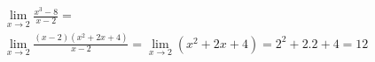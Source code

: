 \begin{ex}
\begin{align}
&\lim_{x\rightarrow 2} \frac{x^3-8}{x-2}=\nonumber\\
&\lim_{x\rightarrow 2} \frac{(x-2)(x^2+2x+4)}{x-2}=\lim_{x\rightarrow 2} (x^2+2x+4)=2^2+2.2+4=12\nonumber
\end{align}
\end{ex}